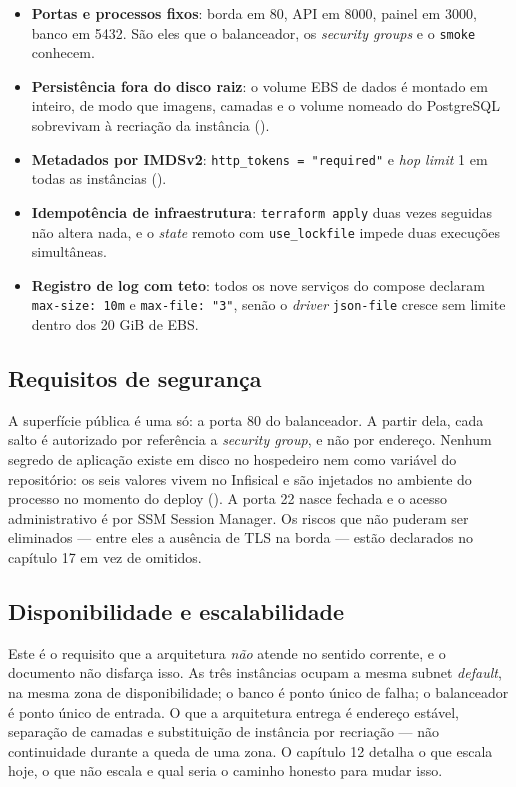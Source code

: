 \documentclass[11pt,a4paper]{article}
\begin{document}
\begin{itemize}
  \item \textbf{Portas e processos fixos}: borda em 80, API em 8000, painel em 3000, banco em 5432.
        São eles que o balanceador, os \emph{security groups} e o \texttt{smoke} conhecem.
  \item \textbf{Persistência fora do disco raiz}: o volume EBS de dados é montado em
         inteiro, de modo que imagens, camadas e o volume nomeado do
        PostgreSQL sobrevivam à recriação da instância ().
  \item \textbf{Metadados por IMDSv2}: \texttt{http\_\allowbreak{}tokens = "required"} e \emph{hop limit} 1 em
        todas as instâncias ().
  \item \textbf{Idempotência de infraestrutura}: \texttt{terraform apply} duas vezes seguidas não
        altera nada, e o \emph{state} remoto com \texttt{use\_lockfile} impede duas execuções
        simultâneas.
  \item \textbf{Registro de log com teto}: todos os nove serviços do compose declaram
        \texttt{max-size: 10m} e \texttt{max-file: "3"}, senão o \emph{driver} \texttt{json-file}
        cresce sem limite dentro dos 20 GiB de EBS.
\end{itemize}

\subsection{Requisitos de segurança}

A superfície pública é uma só: a porta 80 do balanceador. A partir dela, cada salto é autorizado por
referência a \emph{security group}, e não por endereço. Nenhum segredo de aplicação existe em disco
no hospedeiro nem como variável do repositório: os seis valores vivem no Infisical e são injetados
no ambiente do processo no momento do deploy (). A porta 22 nasce fechada
e o acesso administrativo é por SSM Session Manager. Os riscos que não puderam ser eliminados ---
entre eles a ausência de TLS na borda --- estão declarados no capítulo 17 em vez de omitidos.

\subsection{Disponibilidade e escalabilidade}

Este é o requisito que a arquitetura \emph{não} atende no sentido corrente, e o documento não
disfarça isso. As três instâncias ocupam a mesma subnet \emph{default}, na mesma zona de
disponibilidade; o banco é ponto único de falha; o balanceador é ponto único de entrada. O que a
arquitetura entrega é endereço estável, separação de camadas e substituição de instância por
recriação --- não continuidade durante a queda de uma zona. O capítulo 12 detalha o que escala
hoje, o que não escala e qual seria o caminho honesto para mudar isso.
\end{document}
